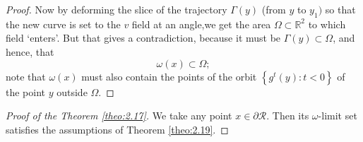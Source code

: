 \begin{theorem}
\begin{proof}
		Now by deforming the slice of the trajectory $\Gamma (y)$ (from $ y $ to $ y_ {1}) $ so that the new curve is set to the $ v $ field at an angle,we get the area $ \Omega \subset \mathbb {R} ^ {2} $ to which field `enters'. But that gives a contradiction, because it must be $\Gamma (y)\subset \Omega $, and hence, that
		$$
		\omega (x)\subset \Omega ;
		$$
		note that $ \omega (x) $ must also contain the points of the orbit $\left\{ g^{t}(y):t<0\right\} $ of the point  $ y $ outside $ \Omega $.
	\end{proof}
\end{theorem}

\begin{proof}[Proof of the Theorem \ref{theo:2.17}]
	We take any point $ x \in \partial \mathcal {R} $. Then its $ \omega$-limit set satisfies the assumptions of Theorem \ref{theo:2.19}.
\end{proof}

